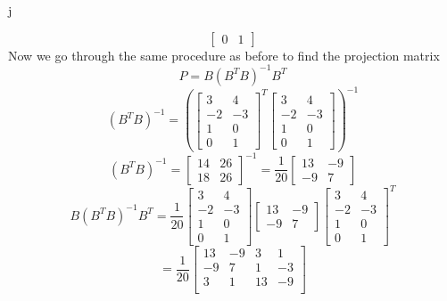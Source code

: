 j\documentclass[12pt]{article}
\begin{document}
\begin{enumerate}
\[\begin{bmatrix}
            0&1
        \end{bmatrix}
        \]
        Now we go through the same procedure as before to find the projection matrix
        \[
        P = B(B^TB)^{-1}B^T
        \]
        \[
        (B^TB)^{-1} = \left( 
        \begin{bmatrix}
            3&4\\
            -2&-3\\
            1&0\\
            0&1
        \end{bmatrix}^T
        \begin{bmatrix}
            3&4\\
            -2&-3\\
            1&0\\
            0&1
        \end{bmatrix}
        \right)^{-1}
        \]
        \[
        (B^TB)^{-1}= 
        \begin{bmatrix}
            14&26\\
            18&26
        \end{bmatrix}^{-1}
        =\frac{1}{20}
        \begin{bmatrix}
            13&-9\\
            -9&7
        \end{bmatrix}
        \]
        \[
        B(B^TB)^{-1}B^T= \frac{1}{20}
        \begin{bmatrix}
            3&4\\
            -2&-3\\
            1&0\\
            0&1
        \end{bmatrix}
        \begin{bmatrix}
            13&-9\\
            -9&7
        \end{bmatrix}
        \begin{bmatrix}
            3&4\\
            -2&-3\\
            1&0\\
            0&1
        \end{bmatrix}^T
        \]
        \[
        =
        \frac{1}{20}
        \begin{bmatrix}
        13 & -9 & 3 & 1 \\
        -9 & 7 & 1 & -3 \\
        3 & 1 & 13 & -9 \\

\end{bmatrix}\]
\end{enumerate}
\end{document}
